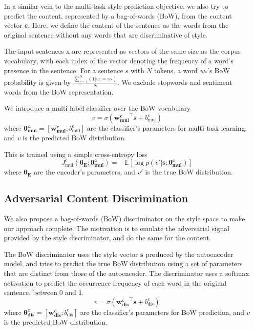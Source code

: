 \documentclass[letterpaper]{article} %
\newcommand{\rmx}{\mathrm x}
\newcommand{\loss}[2]{J_{\text{#1}}^{\text{#2}}}
\newcommand{\nnweight}[2]{\bm{\theta_{\text{#1}}^{\text{#2}}}}
\newcommand{\weight}[2]{\bm{w_{\text{#1}}^{\text{#2}}}}
\newcommand{\bias}[2]{b_{\text{#1}}^{\text{#2}}}
\begin{document}
In a similar vein to the multi-task style prediction objective, we also try to predict the content, represented by a bag-of-words (BoW), from the content vector $\bm c$.
Here, we define the content of the sentence as the words from the original sentence without any words that are discriminative of style.

The input sentences $\rmx$ are represented as vectors of the same size as the corpus vocabulary, with each index of the vector denoting the frequency of a word's presence in the sentence.
For a sentence $s$ with $N$ tokens, a word $w_*$'s BoW probability is given by $\frac{\sum_{i=1}^{N}{(1 | w_i = w_*)}}{N}$.
We exclude stopwords and sentiment words \cite{hu2004mining} from the BoW representation.

We introduce a multi-label classifier over the BoW vocabulary
\begin{equation} \label{eqn:bow-pred}
	v = \sigma({\weight{mul}{c}}^\top \bm s + \bias{mul}{c})
\end{equation}
where $\nnweight{mul}{c}=[\weight{mul}{c}; \bias{mul}{c}]$ are the classifier's parameters for multi-task learning, and $v$ is the predicted BoW distribution.

This is trained using a simple cross-entropy loss
\begin{equation} \label{eqn:content-multi-task-loss}
	\loss{mul}{c}(\nnweight{E}{};\nnweight{mul}{c}) =
	- \mathbb{E} [\log p(v' | \bm s; \nnweight{mul}{c})]
\end{equation}
where $\nnweight{E}{}$ are the encoder's parameters, and $v'$ is the true BoW distribution.


\subsection{Adversarial Content Discrimination} \label{ssec:adversarial-content-objective}

We also propose a bag-of-words (BoW) discriminator on the style space to make our approach complete.
The motivation is to emulate the adversarial signal provided by the style discriminator, and do the same for the content.

The BoW discriminator uses the style vector $\bm s$ produced by the autoencoder model, and tries to predict the true BoW distribution using a set of parameters that are distinct from those of the autoencoder.
The discriminator uses a softmax activation to predict the occurrence frequency of each word in the original sentence, between $0$ and $1$.
\begin{equation}
	v = \sigma({\weight{dis}{c}}^\top \bm s + \bias{dis}{c})
\end{equation}
where $\nnweight{dis}{c}=[\weight{dis}{c}; \bias{dis}{c}]$ are the classifier's parameters for BoW prediction, and $v$ is the predicted BoW distribution.
\end{document}
